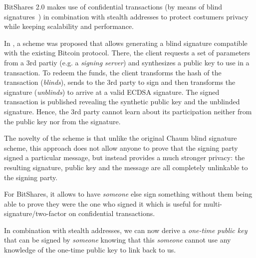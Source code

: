
BitShares 2.0 makes use of confidential transactions (by means of blind
signatures~\cite{blindSigPaper}) in combination with stealth addresses to
protect costumers privacy while keeping scalability and performance.

In \cite{blindSigPaper}, a scheme was proposed that allows generating a blind
signature compatible with the existing Bitcoin protocol. There, the client
requests a set of parameters from a 3rd partiy (e.g. a \emph{signing server})
and synthesizes a public key to use in a transaction. To redeem the funds, the
client transforms the hash of the transaction (\emph{blinds}), sends to the 3rd
party to sign and then transforms the signature (\emph{unblinds}) to arrive at
a valid ECDSA signature. The signed transaction is published revealing the
synthetic public key and the unblinded signature. Hence, the 3rd party cannot
learn about its participation neither from the public key nor from the
signature.

The novelty of the scheme is that unlike the original Chaum blind signature
scheme, this approach does not allow anyone to prove that the signing party
signed a particular message, but instead provides a much stronger privacy: the
resulting signature, public key and the message are all completely unlinkable
to the signing party.

For BitShares, it allows to have \emph{someone} else sign something without
them being able to prove they were the one who signed it which is useful for
multi-signature/two-factor on confidential transactions.

In combination with stealth addresses, we can now derive a \emph{one-time
public key} that can be signed by \emph{someone} knowing that this
\emph{someone} cannot use any knowledge of the one-time public key to link back
to us.
